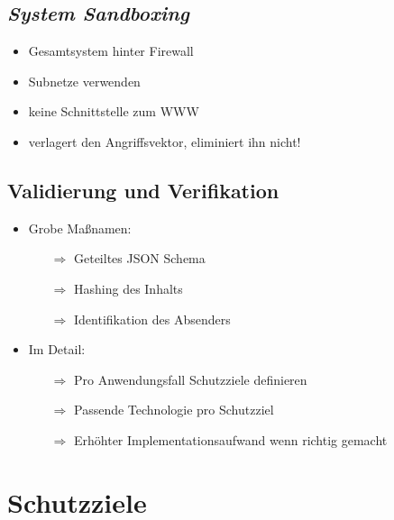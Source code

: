 \documentclass{beamer}
\begin{document}
\subsection{\em System Sandboxing}
\begin{frame}{\insertsubsection}
	\begin{itemize}
		\setlength\itemsep{2em}
		\item Gesamtsystem hinter Firewall
		\item Subnetze verwenden
		\item keine Schnittstelle zum WWW
		\item verlagert den Angriffsvektor, eliminiert ihn nicht!
	\end{itemize}
\end{frame}


\subsection{Validierung und Verifikation}
\begin{frame}{\insertsubsection}
	\begin{itemize}
		\setlength\itemsep{1em}
		\item Grobe Maßnamen:
		\begin{itemize}
			\item[$\Rightarrow$] Geteiltes JSON Schema
			\item[$\Rightarrow$] Hashing des Inhalts
			\item[$\Rightarrow$] Identifikation des Absenders
		\end{itemize}
		\item Im Detail: 
		\begin{itemize}
			\item[$\Rightarrow$] Pro Anwendungsfall Schutzziele definieren
			\item[$\Rightarrow$] Passende Technologie pro Schutzziel
			\item[$\Rightarrow$] Erhöhter Implementationsaufwand wenn richtig gemacht
		\end{itemize}
	\end{itemize}
\end{frame}

\section{Schutzziele}
\end{document}
